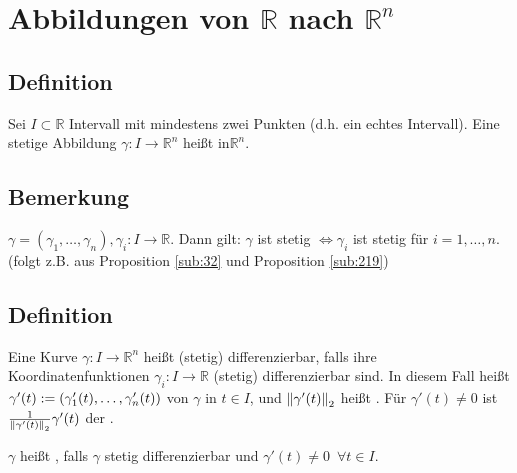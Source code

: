 \section{Abbildungen von $\mathds{R}$ nach $\mathds{R}^n$} %
\label{sec:5}

\subsection[Definition: Kurve]{Definition} %
\label{sub:51}
Sei $I \subset \mathds{R}$ Intervall mit mindestens zwei Punkten (d.h. ein echtes Intervall). Eine stetige Abbildung $\gamma : I \to \mathds{R}^n$ heißt  
in$\mathds{R}^n$. 

\subsection[Bemerkung: Stetigkeit von $\gamma : \mathds{R} \to \mathds{R}^n$]{Bemerkung} %
\label{sub:52}
$\gamma = (\gamma_1,\ldots ,\gamma_n), \gamma_i : I \to \mathds{R}$. Dann gilt: $\gamma$ ist stetig $\iff \gamma_i$ ist stetig für $i=1,\ldots ,n$.
(folgt z.B. aus Proposition \ref{sub:32} und Proposition \ref{sub:219})

\subsection[Definition: Tangentialvektor, Geschwindigkeit und regulär]{Definition} %
\label{sub:53}
Eine Kurve $\gamma : I  \to \mathds{R}^n$ heißt (stetig) differenzierbar, falls ihre Koordinatenfunktionen $\gamma_i : I  \to \mathds{R}$ (stetig) differenzierbar sind.
In diesem Fall heißt $\gamma'(t) := (\gamma'_1 (t), \ldots , \gamma'_n(t)) $  von $\gamma$ in $t \in I$, und $\norm[2]{\gamma'(t)} $ heißt
. Für $\gamma'(t) \not= 0$ ist $\frac{1}{\norm[2]{\gamma'(t)} } \gamma'(t) $ der .

$\gamma$ heißt , falls $\gamma$ stetig differenzierbar und $\gamma'(t) \not=0 \enspace\forall t \in I$.    

